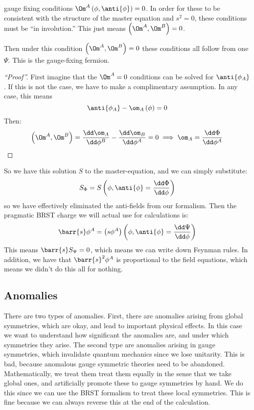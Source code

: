 \documentclass{booc}
\begin{document}
gauge fixing conditions $\Om^A\left( \phi , \anti{\phi} \right) = 0$.
In order for these to be consistent with the structure of the master equation and 
$s^2 = 0$, these conditions must be ``in involution.''
This just means $\left( \Om^A , \Om^B \right) = 0$. 
\begin{thm}
Then under this condition $\left( \Om^A , \Om^B \right) = 0$
these conditions all follow from one $\Psi$.
This is the gauge-fixing fermion.
\end{thm}
\begin{proof}[``Proof'']
First imagine that the $\Om^A = 0$ conditions can be solved 
for $\anti{\phi_A}$. 
If this is not the case, we have to make a complimentary assumption. 
In any case, this means
\begin{equation}
\anti{\phi_A} - \om_A\left( \phi \right) = 0
\end{equation}
Then:
\begin{equation}
\left( \Om^A , \Om^B \right) = 
\frac{\dd\om_A}{\dd\phi^B} - 
\frac{\dd\om_B}{\dd\phi^A}  =0
\implies
\om_A = 
\frac{\dd\Phi}{\dd \phi^A}
\end{equation}
\end{proof}
So we have this solution $S$ to the master-equation, and we can simply substitute:
\begin{equation}
S_{\Phi} = S\left( \phi , \anti{\phi} = \frac{\dd\Phi}{\dd\phi} \right)
\end{equation}
so we have effectively eliminated the anti-fields from our formalism.
Then the pragmatic BRST charge we will actual use for calculations is:
\begin{equation}
\barr{s}\phi^A = \left( s \phi^A \right)\left( \phi , \anti{\phi} = \frac{\dd\Psi}{\dd \phi} \right)
\end{equation}
This means $\barr{s}S_\Psi = 0$, which means we can 
write down Feynman rules. 
In addition, we have that $\barr{s}^2\phi^A$ is proportional to the field equations, which 
means we didn't do this all for nothing.

\subsection{Anomalies}

There are two types of anomalies.
First, there are anomalies arising from global symmetries, which are okay, 
and lead to important physical effects. 
In this case we want to understand how significant the anomalies are,
and under which symmetries they arise.
The second type are anomalies arising in gauge symmetries, which invalidate quantum mechanics
since we lose unitarity. This is bad, because anomalous gauge symmetric theories need to be
abandoned. 
Mathematically,  we treat them treat them equally in the sense that
we take global ones, and artificially promote these to gauge symmetries by hand.
We do this since we can use the BRST formalism to treat these local symmetries.
This is fine because we can always reverse this at the end of the calculation.
\end{document}
